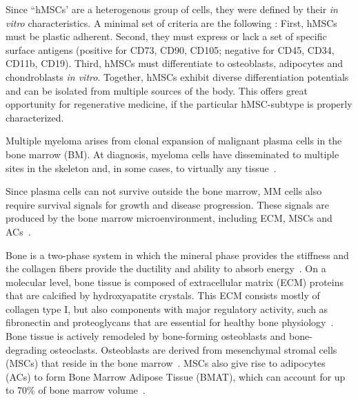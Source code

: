 Since ``hMSCs' are a heterogenous group of cells, they were defined by their
\textit{in vitro} characteristics. A minimal set of criteria are the following
\cite{dominiciMinimalCriteriaDefining2006}: First, hMSCs must be plastic
adherent. Second, they must express or lack a set of specific surface antigens
(positive for CD73, CD90, CD105; negative for CD45, CD34, CD11b, CD19). Third,
hMSCs must differentiate to osteoblasts, adipocytes and chondroblasts \textit{in
    vitro}. Together, hMSCs exhibit diverse differentiation potentials and can be
isolated from multiple sources of the body. This offers great opportunity for
regenerative medicine, if the particular hMSC-subtype is properly characterized.


Multiple myeloma arises from clonal expansion of malignant plasma cells in the
bone marrow (BM). At diagnosis, myeloma cells have disseminated to multiple
sites in the skeleton and, in some cases, to virtually any
tissue~\cite{rajkumarMultipleMyelomaCurrent2020,
    bladeExtramedullaryDiseaseMultiple2022}.


Since plasma cells can not survive outside the bone marrow, MM cells also
require survival signals for growth and disease progression. These signals are
produced by the bone marrow microenvironment, including ECM, MSCs and
ACs~\cite{kiblerAdhesiveInteractionsHuman1998,
    garcia-ortizRoleTumorMicroenvironment2021}.


Bone is a two-phase system in which the mineral phase provides the stiffness and
the collagen fibers provide the ductility and ability to absorb
energy~\cite{viguet-carrinRoleCollagenBone2006}. On a molecular level, bone
tissue is composed of extracellular matrix (ECM) proteins that are calcified by
hydroxyapatite crystals. This ECM consists mostly of collagen type I, but also
components with major regulatory activity, such as fibronectin and proteoglycans
that are essential for healthy bone
physiology~\cite{alcorta-sevillanoDecipheringRelevanceBone2020}. Bone tissue is
actively remodeled by bone-forming osteoblasts and bone-degrading osteoclasts.
Osteoblasts are derived from mesenchymal stromal cells (MSCs) that reside in the
bone marrow~\cite{friedensteinOsteogenesisTransplantsBone1966,
    pittengerMultilineagePotentialAdult1999}. MSCs also give rise to adipocytes
(ACs) to form Bone Marrow Adipose Tissue (BMAT), which can account for up to
70\% of bone marrow volume~\cite{fazeliMarrowFatBone2013}.

